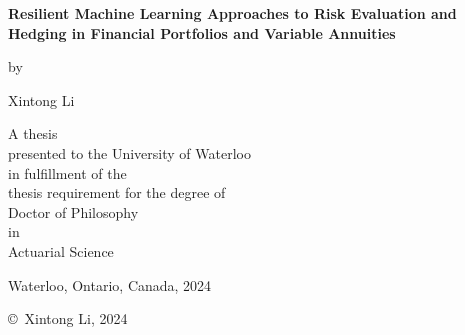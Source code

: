 \pagestyle{empty}

\begin{titlepage}
        \begin{center}
        \vspace*{1.0cm}

        \Huge
        {\bf Resilient Machine Learning Approaches to Risk Evaluation and Hedging in Financial Portfolios and Variable Annuities}

        \vspace*{1.0cm}

        \normalsize
        by \\

        \vspace*{1.0cm}

        \Large
        Xintong Li \\

        \vspace*{3.0cm}

        \normalsize
        A thesis \\
        presented to the University of Waterloo \\ 
        in fulfillment of the \\
        thesis requirement for the degree of \\
        Doctor of Philosophy \\
        in \\
        Actuarial Science \\

        \vspace*{2.0cm}

        Waterloo, Ontario, Canada, 2024 \\

        \vspace*{1.0cm}

        \copyright\ Xintong Li, 2024 \\
        \end{center}
\end{titlepage}

\pagestyle{plain}
\setcounter{page}{2}


